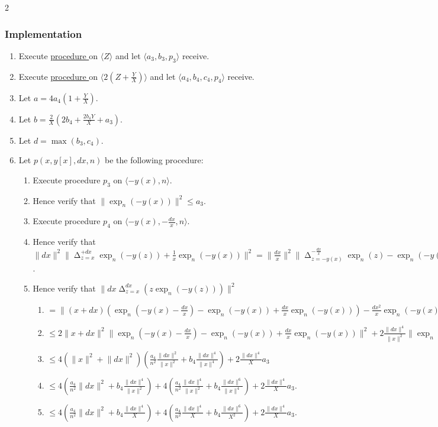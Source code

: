 \documentclass{article}
\DeclareMathOperator*{\diff}{\Delta}
\newcounter{procedure}[part]
\newcommand{\implementation}{\subsubsection*{Implementation}}
\newcommand{\procedurehr}[1]{\hyperref[sec:procedure #1]{procedure \expandafter\csname procedure#1\endcsname}}
\begin{document}
\begin{multicols}{2}
			\implementation
				\begin{enumerate}
					\item Execute \procedurehr{3.13} on $\langle Z\rangle$ and let $\langle a_3,b_3,p_3\rangle$ receive.
					\item Execute \procedurehr{3.19} on $\langle 2(Z+\frac{Y}{X})\rangle$ and let $\langle a_4,b_4,c_4,p_4\rangle$ receive.
					\item Let $a=4a_4(1+\frac{Y}{X})$.
					\item Let $b=\frac{2}{X}(2b_4+\frac{2b_4Y}{X}+a_3)$.
					\item Let $d=\max(b_3,c_4)$.
					\item Let $p(x,y[x],dx,n)$ be the following procedure:
					\begin{enumerate}
						\item Execute procedure $p_3$ on $\langle-y(x),n\rangle$.
						\item Hence verify that $\lVert\exp_n(-y(x))\rVert^2\le a_3$.
						\item Execute procedure $p_4$ on $\langle -y(x),-\frac{dx}{x},n\rangle$.
						\item Hence verify that $\lVert dx\rVert^2\lVert\diff_{z=x}^{+dx}\exp_n(-y(z))+\frac{1}{x}\exp_n(-y(x))\rVert^2=\lVert\frac{dx}{x}\rVert^2\lVert\diff_{z=-y(x)}^{-\frac{dx}{x}}\exp_n(z)-\exp_n(-y(x))\rVert^2\le\frac{a_4}{n^2}\lVert\frac{dx}{x}\rVert^2+b_4\lVert\frac{dx}{x}\rVert^4$.
						\item Hence verify that $\lVert dx\diff_{z=x}^{dx}(z\exp_n(-y(z)))\rVert^2$
						\begin{enumerate}
							\item $=\lVert(x+dx)(\exp_n(-y(x)-\frac{dx}{x})-\exp_n(-y(x))+\frac{dx}{x}\exp_n(-y(x)))-\frac{dx^2}{x}\exp_n(-y(x))\rVert^2$
							\item $\le 2\lVert x+dx\rVert^2\lVert \exp_n(-y(x)-\frac{dx}{x})-\exp_n(-y(x))+\frac{dx}{x}\exp_n(-y(x))\rVert^2+2\frac{\lVert dx\rVert^4}{\lVert x\rVert^2}\lVert\exp_n(-y(x))\rVert^2$
							\item $\le 4(\lVert x\rVert^2+\lVert dx\rVert^2)(\frac{a_4}{n^2}\frac{\lVert dx\rVert^2}{\lVert x\rVert^2}+b_4\frac{\lVert dx\rVert^4}{\lVert x\rVert^4})+2\frac{\lVert dx\rVert^4}{X}a_3$
							\item $\le 4(\frac{a_4}{n^2}\lVert dx\rVert^2+b_4\frac{\lVert dx\rVert^4}{\lVert x\rVert^2})+4(\frac{a_4}{n^2}\frac{\lVert dx\rVert^4}{\lVert x\rVert^2}+b_4\frac{\lVert dx\rVert^6}{\lVert x\rVert^4})+2\frac{\lVert dx\rVert^4}{X}a_3$.
							\item $\le 4(\frac{a_4}{n^2}\lVert dx\rVert^2+b_4\frac{\lVert dx\rVert^4}{X})+4(\frac{a_4}{n^2}\frac{\lVert dx\rVert^4}{X}+b_4\frac{\lVert dx\rVert^6}{X^2})+2\frac{\lVert dx\rVert^4}{X}a_3$.

\end{enumerate}
\end{enumerate}
\end{enumerate}
\end{multicols}
\end{document}
